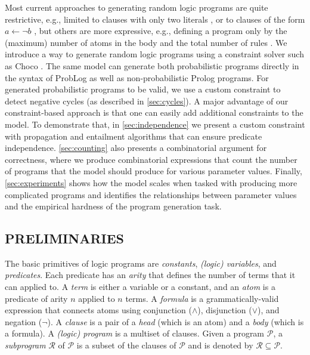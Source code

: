 \documentclass[letterpaper]{article}
\theoremstyle{definition}
\begin{document}
Most current approaches to generating random logic programs are quite
restrictive, e.g., limited to clauses with only two literals
\citep{DBLP:conf/lpnmr/NamasivayamT09}, or to clauses of the form $a \gets \neg
b$ \citep{DBLP:journals/tocl/WenWSL16}, but others are more expressive, e.g.,
defining a program only by the (maximum) number of atoms in the body and the
total number of rules \citep{DBLP:conf/iclp/ZhaoL03,zhao2004answer}. We
introduce a way to generate random logic programs using a constraint solver such
as Choco \citep{choco}. The same model can generate both probabilistic programs
directly in the syntax of ProbLog \citep{DBLP:conf/ijcai/RaedtKT07} as well as
non-probabilistic Prolog programs. For generated probabilistic programs to be
valid, we use a custom constraint to detect negative cycles (as described in
\cref{sec:cycles}). A major advantage of our constraint-based approach is that
one can easily add additional constraints to the model. To demonstrate that, in
\cref{sec:independence} we present a custom constraint with propagation and
entailment algorithms that can ensure predicate independence.
\cref{sec:counting} also presents a combinatorial argument for correctness,
where we produce combinatorial expressions that count the number of programs
that the model should produce for various parameter values. Finally,
\cref{sec:experiments} shows how the model scales when tasked with producing
more complicated programs and identifies the relationships between parameter
values and the empirical hardness of the program generation task.

\subsection{PRELIMINARIES}

The basic primitives of logic programs are \emph{constants}, \emph{(logic)
  variables}, and \emph{predicates}. Each predicate has an \emph{arity} that
defines the number of terms that it can applied to. A \emph{term} is either a
variable or a constant, and an \emph{atom} is a predicate of arity $n$ applied
to $n$ terms. A \emph{formula} is a grammatically-valid expression that connects
atoms using conjunction ($\land$), disjunction ($\lor$), and negation ($\neg$).
A \emph{clause} is a pair of a \emph{head} (which is an atom) and a \emph{body}
(which is a formula). A \emph{(logic) program} is a multiset of clauses. Given a
program $\mathscr{P}$, a \emph{subprogram} $\mathscr{R}$ of $\mathscr{P}$ is a
subset of the clauses of $\mathscr{P}$ and is denoted by $\mathscr{R} \subseteq
\mathscr{P}$.
\end{document}
